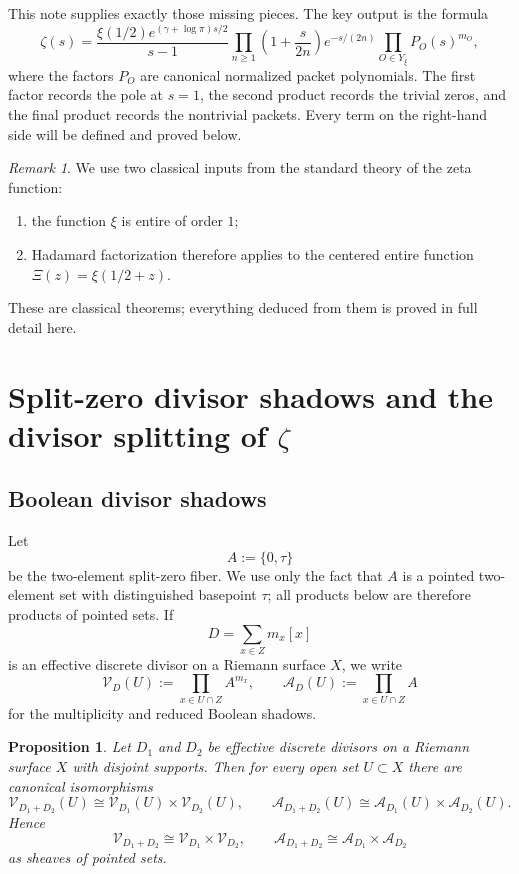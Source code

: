 \documentclass[11pt,a4paper]{article}
\numberwithin{equation}{section}
\newtheorem{proposition}[theorem]{Proposition}
\theoremstyle{definition}
\theoremstyle{remark}
\newtheorem{remark}[theorem]{Remark}
\newcommand{\cV}{\mathcal V}
\newcommand{\cA}{\mathcal A}
\begin{document}
This note supplies exactly those missing pieces.  The key output is the formula
\begin{equation}\label{P2:eq:intro-main-factorization}
\zeta(s)
=
\frac{\xi(1/2)e^{(\gamma+\log\pi)s/2}}{s-1}
\prod_{n\ge 1}\left(1+\frac{s}{2n}\right)e^{-s/(2n)}
\prod_{O\in Y_\xi} P_O(s)^{m_O},
\end{equation}
where the factors $P_O$ are canonical normalized packet polynomials.  The first factor records the pole at $s=1$, the second product records the trivial zeros, and the final product records the nontrivial packets.  Every term on the right-hand side will be defined and proved below.

\begin{remark}
We use two classical inputs from the standard theory of the zeta function:
\begin{enumerate}[label=(\arabic*)]
\item the function $\xi$ is entire of order $1$;
\item Hadamard factorization therefore applies to the centered entire function $\Xi(z)=\xi(1/2+z)$.
\end{enumerate}
These are classical theorems; everything deduced from them is proved in full detail here.
\end{remark}

\section{Split-zero divisor shadows and the divisor splitting of $\zeta$}

\subsection{Boolean divisor shadows}

Let
\[
A:=\{0,\tau\}
\]
be the two-element split-zero fiber.  We use only the fact that $A$ is a pointed two-element set with distinguished basepoint $\tau$; all products below are therefore products of pointed sets.  If
\[
D=\sum_{x\in Z} m_x[x]
\]
is an effective discrete divisor on a Riemann surface $X$, we write
\begin{equation}\label{P2:eq:shadow-definitions}
\cV_D(U):=\prod_{x\in U\cap Z} A^{m_x},
\qquad
\cA_D(U):=\prod_{x\in U\cap Z} A
\end{equation}
for the multiplicity and reduced Boolean shadows.

\begin{proposition}\label{P2:prop:shadow-product-disjoint}
Let $D_1$ and $D_2$ be effective discrete divisors on a Riemann surface $X$ with disjoint supports.  Then for every open set $U\subset X$ there are canonical isomorphisms
\[
\cV_{D_1+D_2}(U)\cong \cV_{D_1}(U)\times \cV_{D_2}(U),
\qquad
\cA_{D_1+D_2}(U)\cong \cA_{D_1}(U)\times \cA_{D_2}(U).
\]
Hence
\[
\cV_{D_1+D_2}\cong \cV_{D_1}\times \cV_{D_2},
\qquad
\cA_{D_1+D_2}\cong \cA_{D_1}\times \cA_{D_2}
\]
as sheaves of pointed sets.
\end{proposition}
\end{document}

